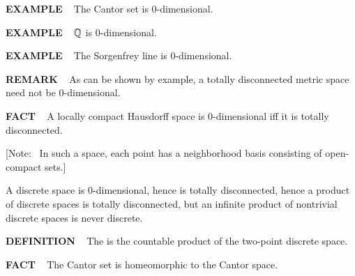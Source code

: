 \begin{x}{\small\bf EXAMPLE} \ %
The Cantor set is 0-dimensional.
\end{x}

\vspace{0.1cm}

\begin{x}{\small\bf EXAMPLE} \ %
$\mathbb{Q}$ is 0-dimensional.
\end{x}

\vspace{0.1cm}

\begin{x}{\small\bf EXAMPLE} \ %
The Sorgenfrey line is 0-dimensional.
\end{x}

\vspace{0.1cm}

\begin{x}{\small\bf REMARK} \ %
As can be shown by example, a totally disconnected metric space need not be 0-dimensional.
\end{x}

\vspace{0.1cm}

\begin{x}{\small\bf FACT} \ %
A locally compact Hausdorff space is 0-dimensional iff it is totally disconnected.

\vspace{0.1cm}

[Note: \ In such a space, each point has a neighborhood basis consisting of open-compact sets.]
\end{x}

\vspace{0.1cm}

A discrete space is 0-dimensional, hence is totally disconnected, hence a product of discrete spaces is totally disconnected, but an infinite product of nontrivial discrete spaces is never discrete.

\vspace{0.2cm}

\begin{x}{\small\bf DEFINITION} \ %
The 
is the countable product of the two-point discrete space.
\end{x}

\vspace{0.1cm}
\begin{x}{\small\bf FACT} \ %
The Cantor set is homeomorphic to the Cantor space.
\end{x}

